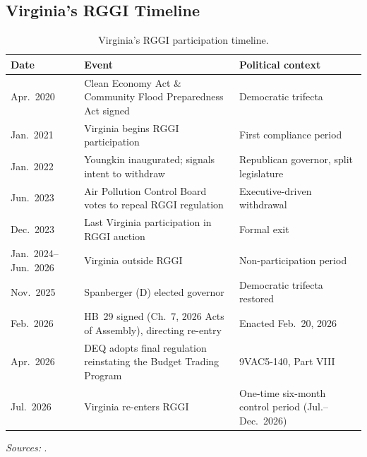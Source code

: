 \documentclass[12pt]{article}
\begin{document}
\subsection{Virginia's RGGI Timeline}\label{sec:va-timeline}
\begin{table}[H]
\centering
\caption{Virginia's RGGI participation timeline.}
\label{tab:va-timeline}
\begin{threeparttable}
\begin{tabular}{@{}p{2.6cm}p{6.2cm}p{4.6cm}@{}}
\toprule
Date & Event & Political context \\
\midrule
Apr.\ 2020 & Clean Economy Act \& Community Flood Preparedness Act signed & Democratic trifecta \\
Jan.\ 2021 & Virginia begins RGGI participation & First compliance period \\
Jan.\ 2022 & Youngkin inaugurated; signals intent to withdraw & Republican governor, split legislature \\
Jun.\ 2023 & Air Pollution Control Board votes to repeal RGGI regulation & Executive-driven withdrawal \\
Dec.\ 2023 & Last Virginia participation in RGGI auction & Formal exit \\
Jan.\ 2024--Jun.\ 2026 & Virginia outside RGGI & Non-participation period \\
Nov.\ 2025 & Spanberger (D) elected governor & Democratic trifecta restored \\
Feb.\ 2026 & HB~29 signed (Ch.\ 7, 2026 Acts of Assembly), directing re-entry & Enacted Feb.\ 20, 2026 \\
Apr.\ 2026 & DEQ adopts final regulation reinstating the \co{} Budget Trading Program & 9VAC5-140, Part VIII \\
Jul.\ 2026 & Virginia re-enters RGGI & One-time six-month control period (Jul.--Dec.\ 2026) \\
\bottomrule
\end{tabular}
\begin{tablenotes}\footnotesize
\item \textit{Sources:} \citet{VCEA2020,VAAPCB2023_repeal,VAHB29_2026,VADEQ2026_reinstate,RGGI_auctions}.
\end{tablenotes}
\end{threeparttable}
\end{table}
\end{document}

